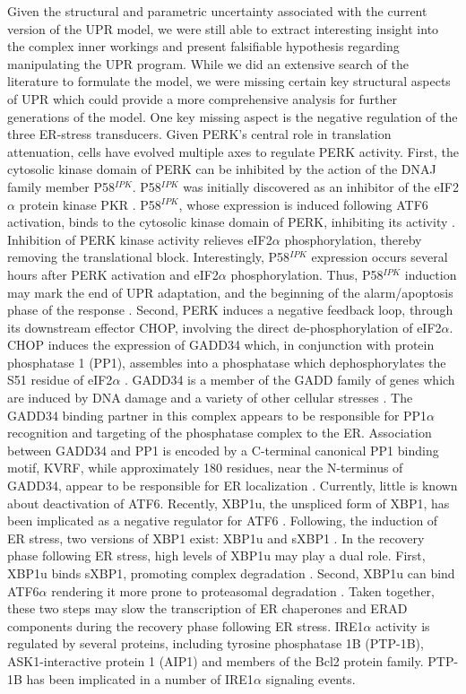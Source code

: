 \documentclass[12pt]{article}
\begin{document}
Given the structural and parametric uncertainty associated with the current version of the UPR model, we were still able to extract interesting insight into the complex inner workings and present falsifiable hypothesis regarding manipulating the UPR program. While we did an extensive search of the literature to formulate the model, we were missing certain key structural aspects of UPR which could provide a more comprehensive analysis for further generations of the model. One key missing aspect is the negative regulation of the three ER-stress transducers. Given PERK's central role in translation attenuation, cells have evolved multiple axes to regulate PERK activity. First, the cytosolic kinase domain of PERK can be inhibited by the action of the DNAJ family member P58$^{IPK}$. P58$^{IPK}$ was initially discovered as an inhibitor of the eIF2$\alpha$ protein kinase PKR \cite{Lee:1990ye}. P58$^{IPK}$, whose expression is induced following ATF6 activation, binds to the cytosolic kinase domain of PERK, inhibiting its activity \cite{Yan:2002fk,Huizen:2003qo}. Inhibition of PERK kinase activity relieves eIF2$\alpha$ phosphorylation, thereby removing the translational block. Interestingly, P58$^{IPK}$ expression occurs several hours after PERK activation and eIF2$\alpha$ phosphorylation. Thus, P58$^{IPK}$ induction may mark the end of UPR adaptation, and the beginning of the alarm/apoptosis phase of the response \cite{szegezdi2006mediators}. Second, PERK induces a negative feedback loop, through its downstream effector CHOP, involving the direct de-phosphorylation of eIF2$\alpha$. CHOP induces the expression of GADD34 which, in conjunction with protein phosphatase 1 (PP1), assembles into a phosphatase which dephosphorylates the S51 residue of eIF2$\alpha$ \cite{Novoa:2001mb}. GADD34 is a member of the GADD family of genes which are induced by DNA damage and a variety of other cellular stresses \cite{Zhan:1994cq}. The GADD34 binding partner in this complex appears to be responsible for PP1$\alpha$ recognition and targeting of the phosphatase complex to the ER. Association between GADD34 and PP1 is encoded by a C-terminal canonical PP1 binding motif, KVRF, while approximately 180 residues, near the N-terminus of GADD34, appear to be responsible for ER localization \cite{Brush:2003kh}. Currently, little is known about deactivation of ATF6. Recently, XBP1u, the unspliced form of XBP1, has been implicated as a negative regulator for ATF6 \cite{Yoshida:2009bs}. Following, the induction of ER stress, two versions of XBP1 exist: XBP1u and sXBP1 \cite{Yoshida:2009bs}. In the recovery phase following ER stress, high levels of XBP1u may play a dual role. First, XBP1u binds sXBP1, promoting complex degradation \cite{Yoshida:2006dz, Tirosh:2006fv}. Second, XBP1u can bind ATF6$\alpha$ rendering it more prone to proteasomal degradation \cite{Yoshida:2009bs}. Taken together, these two steps may slow the transcription of ER chaperones and ERAD components during the recovery phase following ER stress. IRE1$\alpha$ activity is regulated by several proteins, including tyrosine phosphatase 1B (PTP-1B), ASK1-interactive protein 1 (AIP1) and members of the Bcl2 protein family. PTP-1B has been implicated in a number of IRE1$\alpha$ signaling events. 
\end{document}
